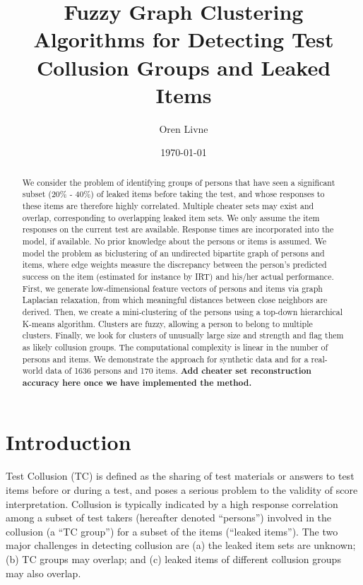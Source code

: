 \documentclass{article}
\title{Fuzzy Graph Clustering Algorithms for Detecting Test Collusion Groups and Leaked Items}
\author[1]{Oren Livne}
\affil[1]{Educational Testing Service, 660 Rosedale Road, Attn: MS-12, T-197, Princeton, NJ 08540. Email: olivne@ets.org}
\date{\today}
\begin{document}
\maketitle

\begin{abstract}
We consider the problem of identifying groups of persons that have seen a significant subset (20\% - 40\%) of leaked items before taking the test, and whose responses to these items are therefore highly correlated. Multiple cheater sets may exist and overlap, corresponding to overlapping leaked item sets. We only assume the item responses on the current test are available. Response times are incorporated into the model, if available. No prior knowledge about the persons or items is assumed. We model the problem as biclustering of an undirected bipartite graph of persons and items, where edge weights measure the discrepancy between the person's predicted success on the item (estimated for instance by IRT) and his/her actual performance. First, we generate low-dimensional feature vectors of persons and items via graph Laplacian relaxation, from which meaningful distances between close neighbors are derived. Then, we create a mini-clustering of the persons using a top-down hierarchical K-means algorithm. Clusters are fuzzy, allowing a person to belong to multiple clusters. Finally, we look for clusters of unusually large size and strength and flag them as likely collusion groups. The computational complexity is linear in the number of persons and items. We demonstrate the approach for synthetic data and for a real-world data of 1636 persons and 170 items. {\bf Add cheater set reconstruction accuracy here once we have implemented the method.}
\end{abstract}

\section{Introduction}
Test Collusion (TC) is defined as the sharing of test materials or answers to test items before or during a test, and poses a serious problem to the validity of score interpretation. Collusion is typically indicated by a high response correlation among a subset of test takers (hereafter denoted ``persons'') involved in the collusion (a ``TC group'') for a subset of the items (``leaked items''). The two major challenges in detecting collusion are (a) the leaked item sets are unknown; (b) TC groups may overlap; and (c) leaked items of different collusion groups may also overlap.
\end{document}
